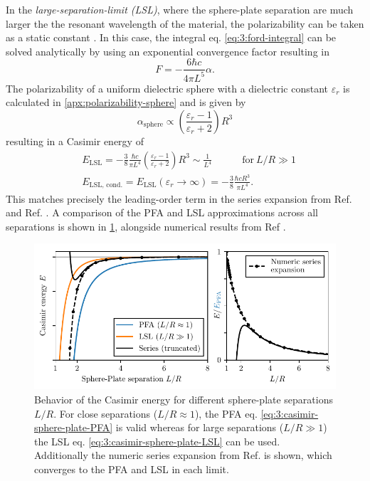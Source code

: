 In the \emph{large-separation-limit (LSL)}, where the sphere-plate separation are much larger the the resonant wavelength of the material, the polarizability can be taken as a static constant \cite{Ford_1998,Kamp_2020}.
In this case, the integral eq. \eqref{eq:3:ford-integral} can be solved analytically by using an exponential convergence factor resulting in
\begin{equation}
  F = -\frac{6 \hbar c}{4 \pi L^5} \alpha .
\end{equation}
The polarizability of a uniform dielectric sphere with a dielectric constant $\varepsilon_r$ is calculated in \cref{apx:polarizability-sphere} and is given by
\begin{equation}\label{eq:3:polarizability-sphere}
  \alpha_\mathrm{sphere} \propto \left(\frac{\varepsilon_r - 1}{\varepsilon_r + 2}\right) R^3
\end{equation}
resulting in a Casimir energy of
\begin{align}\label{eq:3:casimir-sphere-plate-LSL}
  &E_\mathrm{LSL} = -\frac{3}{8} \frac{\hbar c}{\pi L^4} \left(\frac{\varepsilon_r - 1}{\varepsilon_r + 2}\right)R^3 \sim \frac{1}{L^4} \quad\quad\quad \text{for}\ L/R \gg 1 \\ \label{eq:3:casimir-sphere-plate-LSL-conducting}
  &E_\mathrm{LSL,\,cond.} = E_\mathrm{LSL}(\varepsilon_r \rightarrow \infty) = -\frac{3}{8} \frac{\hbar c R^3}{\pi L^4} .
\end{align}
This matches precisely the leading-order term in the series expansion from Ref. \cite{Emig_2007a} and Ref. \cite{Pirozhenko_2013}.
A comparison of the PFA and LSL approximations across all separations is shown in \cref{fig:3:casimir-behavior}, alongside numerical results from Ref \cite{Emig_2007a}.
\begin{figure}[!ht]
  \centering
  \includegraphics[width=\textwidth]{./../figures/casimir/casimir-behavior.pdf}
  \caption{Behavior of the Casimir energy for different sphere-plate separations $L/R$. For close separations ($L/R \approx 1$), the PFA eq. \eqref{eq:3:casimir-sphere-plate-PFA} is valid whereas for large separations ($L/R \gg 1$) the LSL eq. \eqref{eq:3:casimir-sphere-plate-LSL} can be used. Additionally the numeric series expansion from Ref. \cite{Emig_2007a} is shown, which converges to the PFA and LSL in each limit.}
  \label{fig:3:casimir-behavior}
\end{figure}

